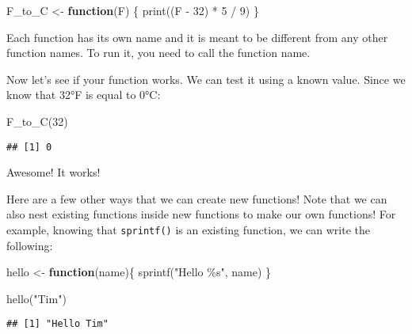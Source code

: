 \documentclass[
]{book}
\newenvironment{Shaded}{\begin{snugshade}}{\end{snugshade}}
\newcommand{\ControlFlowTok}[1]{\textcolor[rgb]{0.13,0.29,0.53}{\textbf{#1}}}
\newcommand{\DecValTok}[1]{\textcolor[rgb]{0.00,0.00,0.81}{#1}}
\newcommand{\FunctionTok}[1]{\textcolor[rgb]{0.00,0.00,0.00}{#1}}
\newcommand{\NormalTok}[1]{#1}
\newcommand{\OtherTok}[1]{\textcolor[rgb]{0.56,0.35,0.01}{#1}}
\newcommand{\SpecialCharTok}[1]{\textcolor[rgb]{0.00,0.00,0.00}{#1}}
\newcommand{\StringTok}[1]{\textcolor[rgb]{0.31,0.60,0.02}{#1}}
\begin{document}
\begin{Shaded}
\begin{Highlighting}[]
\NormalTok{F\_to\_C }\OtherTok{\textless{}{-}} \ControlFlowTok{function}\NormalTok{(F) \{}
    \FunctionTok{print}\NormalTok{((F }\SpecialCharTok{{-}} \DecValTok{32}\NormalTok{) }\SpecialCharTok{*} \DecValTok{5} \SpecialCharTok{/} \DecValTok{9}\NormalTok{)}
\NormalTok{\}}
\end{Highlighting}
\end{Shaded}

Each function has its own name and it is meant to be different from any other function names. To run it, you need to call the function name.

Now let's see if your function works. We can test it using a known value. Since we know that 32°F is equal to 0°C:

\begin{Shaded}
\begin{Highlighting}[]
\FunctionTok{F\_to\_C}\NormalTok{(}\DecValTok{32}\NormalTok{)}
\end{Highlighting}
\end{Shaded}

\begin{verbatim}
## [1] 0
\end{verbatim}

Awesome! It works!

Here are a few other ways that we can create new functions! Note that we can also nest existing functions inside new functions to make our own functions! For example, knowing that \texttt{sprintf()} is an existing function, we can write the following:

\begin{Shaded}
\begin{Highlighting}[]
\NormalTok{hello }\OtherTok{\textless{}{-}} \ControlFlowTok{function}\NormalTok{(name)\{}
    \FunctionTok{sprintf}\NormalTok{(}\StringTok{"Hello \%s"}\NormalTok{, name)}
\NormalTok{\}}
\end{Highlighting}
\end{Shaded}

\begin{Shaded}
\begin{Highlighting}[]
\FunctionTok{hello}\NormalTok{(}\StringTok{"Tim"}\NormalTok{)}
\end{Highlighting}
\end{Shaded}

\begin{verbatim}
## [1] "Hello Tim"
\end{verbatim}
\end{document}
